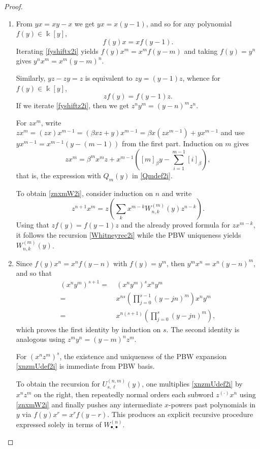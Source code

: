 \documentclass{amsart}
\theoremstyle{definition}
\theoremstyle{remark}
\numberwithin{equation}{section}
\begin{document}
\begin{proof}
\begin{enumerate}
\item [\rm (1)] From $yx = xy-x$ we get $yx = x(y-1)$, and so for any polynomial $f(y)\in\Bbbk[y]$,
\begin{equation}\label{fyshiftx2i}
f(y)x=xf(y-1).
\end{equation}
Iterating \eqref{fyshiftx2i} yields $f(y) x^m = x^m f(y-m)$ and taking $f(y) = y^n$ gives $y^n x^m = x^m(y-m)^n$.

Similarly, $yz-zy=z$ is equivalent to $zy = (y-1)z$, whence for $f(y)\in\Bbbk[y]$,
\begin{equation}\label{fyshiftz2i}
zf(y)=f(y-1)z.
\end{equation}
If we iterate \eqref{fyshiftz2i}, then we get $z^n y^m = (y-n)^m z^n$.

For $zx^m$, write $zx^m = (zx)x^{m-1}=(\beta xz+y)x^{m-1} = \beta x(zx^{m-1})+y x^{m-1}$ and use $y x^{m-1}=x^{m-1}(y-(m-1))$ from the first part. Induction on $m$ gives
\[
zx^m = \beta^m x^m z+x^{m-1}\left([m]_{\beta} y-\sum_{i=1}^{m-1}[i]_{\beta}\right),
\]
that is, the expression with $Q_m(y)$ in \eqref{Qmdef2i}.

To obtain \eqref{znxmW2i}, consider induction on $n$ and write 
$$
z^{n+1}x^m = z\left(\sum_k x^{m-k}W^{(m)}_{n,k}(y)z^{n-k}\right).
$$
Using that $z f(y)=f(y-1)z$ and the already proved formula for $z x^{m-k}$, it follows the recursion \eqref{Whitneyrec2i} while the PBW uniqueness yields $W^{(m)}_{n,k}(y)$.

\item [\rm (2)] Since $f(y)x^n = x^n f(y-n)$ with $f(y) = y^m$, then $y^m x^n = x^n (y-n)^m$, and so that 
\begin{align*}
(x^n y^m)^{s+1} = &\ (x^n y^m)^s x^n y^m \\
= &\, x^{ns}\left(\prod_{j=0}^{s-1}(y-jn)^m\right)x^n y^m \\
= &\, x^{n(s+1)}\left(\prod_{j=0}^{s}(y-jn)^m\right),
\end{align*}
which proves the first identity by induction on $s$. The second identity is analogous using $z^m y^n=(y-m)^n z^m$.

For $(x^n z^m)^s$, the existence and uniqueness of the PBW expansion \eqref{xnzmUdef2i} is immediate from PBW basis.

To obtain the recursion for $U^{(n,m)}_{s,\ell}(y)$, one multiplies \eqref{xnzmUdef2i} by $x^n z^m$ on the right, then repeatedly normal orders each subword $z^{(\cdot)}x^n$ using \eqref{znxmW2i} and finally pushes any intermediate $x$-powers past polynomials in $y$ via $f(y)x^r=x^r f(y-r)$. This produces an explicit recursive procedure expressed solely in terms of $W^{(n)}_{\bullet,\bullet}$.


\end{enumerate}
\end{proof}
\end{document}
